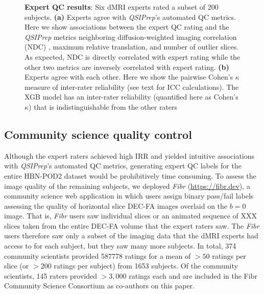 \documentclass[fleqn,10pt]{wlscirep}
\begin{document}
\begin{figure}[ht]
\begin{subfigure}{.5\textwidth}
    \caption{}
    \label{fig:expert-qc:irr}
    \end{subfigure}
    \caption{%
        {\bf Expert QC results}:
        Six dMRI experts rated a subset of \num{200} subjects.
        \textbf{(a)} Experts agree with \emph{QSIPrep}'s automated QC metrics.
        Here we show associations between the expert QC rating and the
        \emph{QSIPrep} metrics neighboring diffusion-weighted imaging
        correlation (NDC) \cite{yeh2019-kb}, maximum relative translation, and
        number of outlier slices. As expected, NDC is directly correlated with expert rating while
        the other two metrics are inversely correlated with expert rating.
        \textbf{(b)} Experts agree with each other. Here we show the pairwise
        Cohen's $\kappa$ measure of inter-rater reliability (see text for ICC
        calculations). The XGB model has an inter-rater reliability (quantified
        here as Cohen's $\kappa$) that is indistinguishable from the other
        raters
    }
    \label{fig:expert-qc}
\end{figure}

\subsection*{Community science quality control}


Although the expert raters achieved high IRR and yielded intuitive associations
with \emph{QSIPrep}'s automated QC metrics, generating expert QC labels for the
entire HBN-POD2 dataset would be prohibitively time consuming. To assess the
image quality of the remaining subjects, we deployed \emph{Fibr}
(\url{https://fibr.dev}), a community science web application in which users
assign binary pass/fail labels assessing the quality of horizontal slice DEC-FA
images overlaid on the $b=0$ image. That is, \emph{Fibr} users saw individual
slices or an animated sequence of XXX slices taken from the entire DEC-FA volume
that the expert raters saw. The \emph{Fibr} users therefore saw only a subset of
the imaging data that the dMRI experts had access to for each subject, but they
saw many more subjects. In total, \num{374} community scientists provided
\num{587778} ratings for a mean of $>50$ ratings per slice (or $>200$ ratings
per subject) from \num{1653} subjects. Of the community scientists, \num{145}
raters provided $>3,000$ ratings each and are included in the Fibr Community
Science Consortium as co-authors on this paper.
\end{document}
